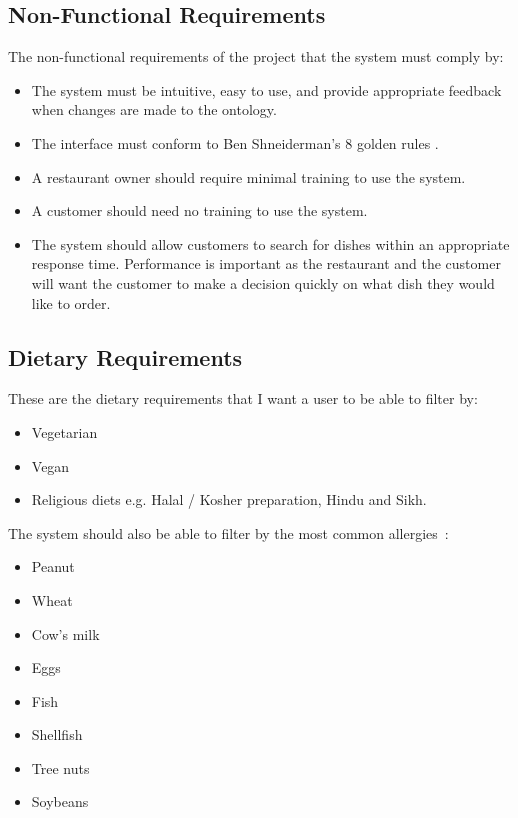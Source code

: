 \subsection{Non-Functional Requirements}

The non-functional requirements of the project that the system must comply by:

\begin{itemize}
\item The system must be intuitive, easy to use, and provide appropriate feedback when changes are made to the ontology.
\item The interface must conform to Ben Shneiderman's 8 golden rules \cite{shneiderman}.
\item A restaurant owner should require minimal training to use the system.
\item A customer should need no training to use the system.
\item The system should allow customers to search for dishes within an appropriate response time. Performance is important as the restaurant and the customer will want the customer to make a decision quickly on what dish they would like to order.
\end{itemize}

\subsection{Dietary Requirements}

These are the dietary requirements that I want a user to be able to filter by:

\begin{itemize}
\item Vegetarian
\item Vegan
\item Religious diets e.g. Halal / Kosher preparation, Hindu and Sikh.
\end{itemize}

The system should also be able to filter by the most common allergies~\cite{burks2001food}:

\begin{itemize}
\item Peanut
\item Wheat
\item Cow's milk
\item Eggs
\item Fish
\item Shellfish
\item Tree nuts
\item Soybeans
\end{itemize}

